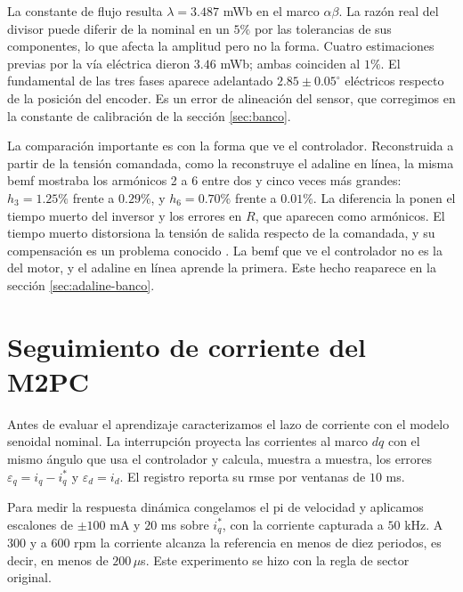 \documentclass[../../../Tesis_JALS_Maestria.tex]{subfiles}
\begin{document}
La constante de flujo resulta $\lambda = 3.487$ mWb en el marco $\alpha\beta$. La razón real del divisor puede diferir de la nominal en un $5\%$ por las tolerancias de sus componentes, lo que afecta la amplitud pero no la forma. Cuatro estimaciones previas por la vía eléctrica dieron $3.46$ mWb; ambas coinciden al $1\%$. El fundamental de las tres fases aparece adelantado $2.85 \pm 0.05^\circ$ eléctricos respecto de la posición del encoder. Es un error de alineación del sensor, que corregimos en la constante de calibración de la sección \ref{sec:banco}.

La comparación importante es con la forma que ve el controlador. Reconstruida a partir de la tensión comandada, como la reconstruye el \acrshort{adaline} en línea, la misma \acrshort{bemf} mostraba los armónicos 2 a 6 entre dos y cinco veces más grandes: $h_3 = 1.25\%$ frente a $0.29\%$, y $h_6 = 0.70\%$ frente a $0.01\%$. La diferencia la ponen el tiempo muerto del inversor y los errores en $R$, que aparecen como armónicos. El tiempo muerto distorsiona la tensión de salida respecto de la comandada, y su compensación es un problema conocido \citep{munoz1999deadtime}. La \acrshort{bemf} que ve el controlador no es la del motor, y el \acrshort{adaline} en línea aprende la primera. Este hecho reaparece en la sección \ref{sec:adaline-banco}.

\section{Seguimiento de corriente del M2PC}
\label{sec:seguimiento-banco}

Antes de evaluar el aprendizaje caracterizamos el lazo de corriente con el modelo senoidal nominal. La interrupción proyecta las corrientes al marco $dq$ con el mismo ángulo que usa el controlador y calcula, muestra a muestra, los errores $\varepsilon_q = i_q - i_q^*$ y $\varepsilon_d = i_d$. El registro reporta su \acrshort{rmse} por ventanas de $10$ ms.

Para medir la respuesta dinámica congelamos el \acrshort{pi} de velocidad y aplicamos escalones de $\pm 100$ mA y $20$ ms sobre $i_q^*$, con la corriente capturada a $50$ kHz. A $300$ y a $600$ rpm la corriente alcanza la referencia en menos de diez periodos, es decir, en menos de $200\,\mu$s. Este experimento se hizo con la regla de sector original.
\end{document}
